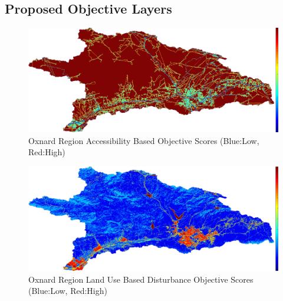     \subsection{Proposed Objective Layers}

        \begin{figure}[!h]
            \begin{center}
            \includegraphics[width=5.5in]{figures/Oxnard_AccessibilityScore.png}   
            \caption{Oxnard Region Accessibility Based Objective Scores (Blue:Low, Red:High)}
            \label{fig:Oaccessibilty}
            \end{center}
        \end{figure}

        \begin{figure}[!h]
            \begin{center}
            \includegraphics[width=5.5in]{figures/Oxnard_DisturbanceScore.png}   
            \caption{Oxnard Region Land Use Based Disturbance Objective Scores (Blue:Low, Red:High)}
            \label{fig:Odisturbance}
            \end{center}
        \end{figure}
        
